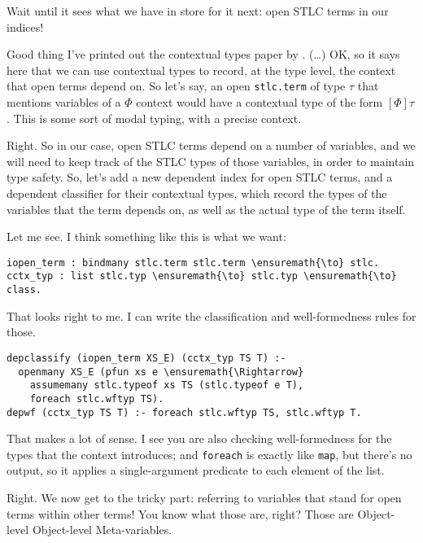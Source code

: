 \heroADVISOR{} Wait until it sees what we have in store for it next: open STLC
terms in our indices!

\heroSTUDENT{} Good thing I've printed out the contextual types paper by
\citet{nanevski2008contextual}. (\ldots{}) OK, so it says here that we
can use contextual types to record, at the type level, the context that
open terms depend on. So let's say, an open \texttt{stlc.term} of type
\(\tau\) that mentions variables of a \(\Phi\) context would have a
contextual type of the form \([\Phi] \tau\). This is some sort of modal
typing, with a precise context.

\heroADVISOR{} Right. So in our case, open STLC terms depend on a number of
variables, and we will need to keep track of the STLC types of those
variables, in order to maintain type safety. So, let's add a new
dependent index for open STLC terms, and a dependent classifier for
their contextual types, which record the types of the variables that the
term depends on, as well as the actual type of the term itself.

\heroSTUDENT{} Let me see. I think something like this is what we want:

\begin{verbatim}
iopen_term : bindmany stlc.term stlc.term \ensuremath{\to} stlc.
cctx_typ : list stlc.typ \ensuremath{\to} stlc.typ \ensuremath{\to} class.
\end{verbatim}

\heroADVISOR{} That looks right to me. I can write the classification and
well-formedness rules for those.

\begin{verbatim}
depclassify (iopen_term XS_E) (cctx_typ TS T) :-
  openmany XS_E (pfun xs e \ensuremath{\Rightarrow}
    assumemany stlc.typeof xs TS (stlc.typeof e T),
    foreach stlc.wftyp TS).
depwf (cctx_typ TS T) :- foreach stlc.wftyp TS, stlc.wftyp T.
\end{verbatim}

\heroSTUDENT{} That makes a lot of sense. I see you are also checking
well-formedness for the types that the context introduces; and
\texttt{foreach} is exactly like \texttt{map}, but there's no output, so
it applies a single-argument predicate to each element of the list.

\heroADVISOR{} Right. We now get to the tricky part: referring to variables
that stand for open terms within other terms! You know what those are,
right? Those are Object-level Object-level Meta-variables.

